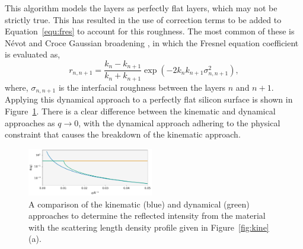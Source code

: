 \documentclass[
 reprint,
 superscriptaddress,
 amsmath,amssymb,
 aps,
]{revtex4-1}
\begin{document}
This algorithm models the layers as perfectly flat layers, which may not be strictly true. 
This has resulted in the use of correction terms to be added to Equation~\ref{equ:fres} to account for this roughness. 
The most common of these is N\'{e}vot and Croce Gaussian broadening \cite{nevot_caracterisation_1980}, in which the Fresnel equation coefficient is evaluated as, 
%
\begin{equation}
    r_{n, n+1} = \frac{k_n - k_{n+1}}{k_n + k_{n+1}} \exp{(-2k_nk_{n+1}\sigma^2_{n,n+1})},
\end{equation}
%
where, $\sigma_{n, n+1}$ is the interfacial roughness between the layers $n$ and $n+1$. 
Applying this dynamical approach to a perfectly flat silicon surface is shown in Figure~\ref{fig:dyna}.
There is a clear difference between the kinematic and dynamical approaches as $q \to 0$, with the dynamical approach adhering to the physical constraint that causes the breakdown of the kinematic approach.  
%
\begin{figure}[t]
    \includegraphics[width=0.49\textwidth]{dyna}
    \caption{A comparison of the kinematic (blue) and dynamical (green) approaches to determine the reflected intensity from the material with the scattering length density profile given in Figure~\ref{fig:kine}(a).}
    \label{fig:dyna}
\end{figure}
%
\end{document}
